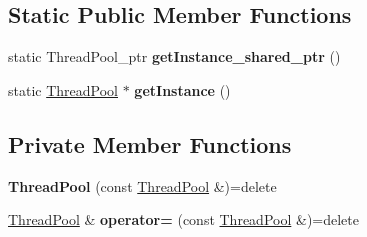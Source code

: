 \subsection*{Static Public Member Functions}
\begin{DoxyCompactItemize}
\item 
static Thread\+Pool\+\_\+ptr {\bfseries get\+Instance\+\_\+shared\+\_\+ptr} ()\hypertarget{class_thread_pool_ab0024061b3024e412e984ae88deda402}{}\label{class_thread_pool_ab0024061b3024e412e984ae88deda402}

\item 
static \hyperlink{class_thread_pool}{Thread\+Pool} $\ast$ {\bfseries get\+Instance} ()\hypertarget{class_thread_pool_a425d9481a69be20791ab1cc60e33c8ad}{}\label{class_thread_pool_a425d9481a69be20791ab1cc60e33c8ad}

\end{DoxyCompactItemize}
\subsection*{Private Member Functions}
\begin{DoxyCompactItemize}
\item 
{\bfseries Thread\+Pool} (const \hyperlink{class_thread_pool}{Thread\+Pool} \&)=delete\hypertarget{class_thread_pool_a8af7ebd9779dcab6e0a48f80e8962d08}{}\label{class_thread_pool_a8af7ebd9779dcab6e0a48f80e8962d08}

\item 
\hyperlink{class_thread_pool}{Thread\+Pool} \& {\bfseries operator=} (const \hyperlink{class_thread_pool}{Thread\+Pool} \&)=delete\hypertarget{class_thread_pool_aa03d0a10cada99d2839b1baba688bc08}{}\label{class_thread_pool_aa03d0a10cada99d2839b1baba688bc08}

\end{DoxyCompactItemize}
